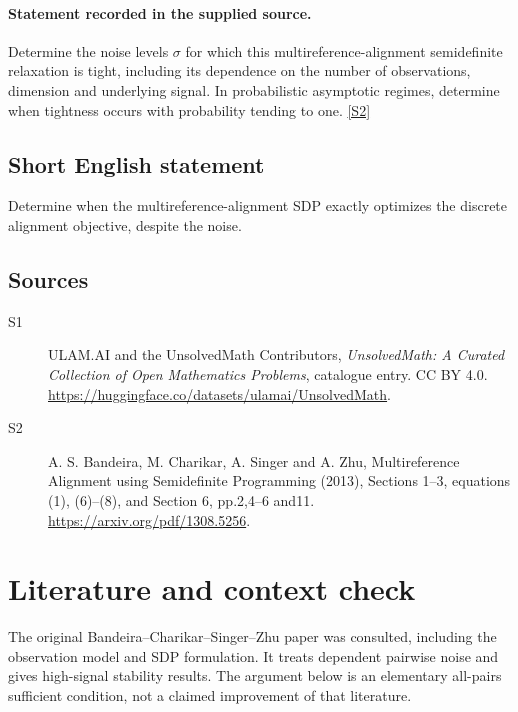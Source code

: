 \documentclass[11pt]{article}
\begin{document}
\paragraph{Statement recorded in the supplied source.}
Determine the noise levels $\sigma$ for which this multireference-alignment semidefinite relaxation is tight, including its dependence on the number of observations, dimension and underlying signal. In probabilistic asymptotic regimes, determine when tightness occurs with probability tending to one. \href{https://arxiv.org/pdf/1308.5256}{[S2]}
\subsection{Short English statement}
Determine when the multireference-alignment SDP exactly optimizes the discrete alignment objective, despite the noise.
\subsection{Sources}
\begin{description}
\item[S1] ULAM.AI and the UnsolvedMath Contributors, \emph{UnsolvedMath: A Curated Collection of Open Mathematics Problems}, catalogue entry. CC BY 4.0. \url{https://huggingface.co/datasets/ulamai/UnsolvedMath}.
\item[S2] A. S. Bandeira, M. Charikar, A. Singer and A. Zhu, Multireference Alignment using Semidefinite Programming (2013), Sections 1--3, equations (1), (6)--(8), and Section 6, pp.2,4--6 and11. \url{https://arxiv.org/pdf/1308.5256}.
\end{description}
\label{end:statement}

\section{Literature and context check}
The original Bandeira--Charikar--Singer--Zhu paper was consulted, including
the observation model and SDP formulation. It treats dependent pairwise noise and
gives high-signal stability results. The argument below is an elementary
all-pairs sufficient condition, not a claimed improvement of that literature.
\end{document}
